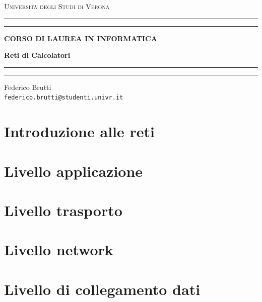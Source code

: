 \documentclass[12pt,a4paper,oneside]{book}
\begin{document}
	
	\begin{titlepage}
		\begin{center}
			{{\LARGE{\textsc{Università degli Studi di Verona}}}} \rule[0.1cm]{15.8cm}{0.1mm}
			\rule[0.5cm]{15.8cm}{0.6mm}
			{\small{\bf CORSO DI LAUREA IN INFORMATICA}}
		\end{center}
		\vspace{12.5mm}
		
		\begin{center}
			{\Huge{\bf Reti di Calcolatori}}
		\end{center}
		\vspace{130mm}
		
		\begin{minipage}[l]{1.8mm}
			\rule[0.1cm]{0.1mm}{2cm}
			\rule[0.1cm]{0.6mm}{2cm}
		\end{minipage}
		\hspace{2mm}
		\begin{minipage}{10cm}	
			{\large{Federico Brutti\\
			\texttt{federico.brutti@studenti.univr.it}}}
		\end{minipage}
	\end{titlepage}
	
	\blankpage
	\tableofcontents
	
	\chapter{Introduzione alle reti}
	
	\chapter{Livello applicazione}
	
	\chapter{Livello trasporto}
	
	\chapter{Livello network}
	
	\chapter{Livello di collegamento dati}
	
\end{document}
